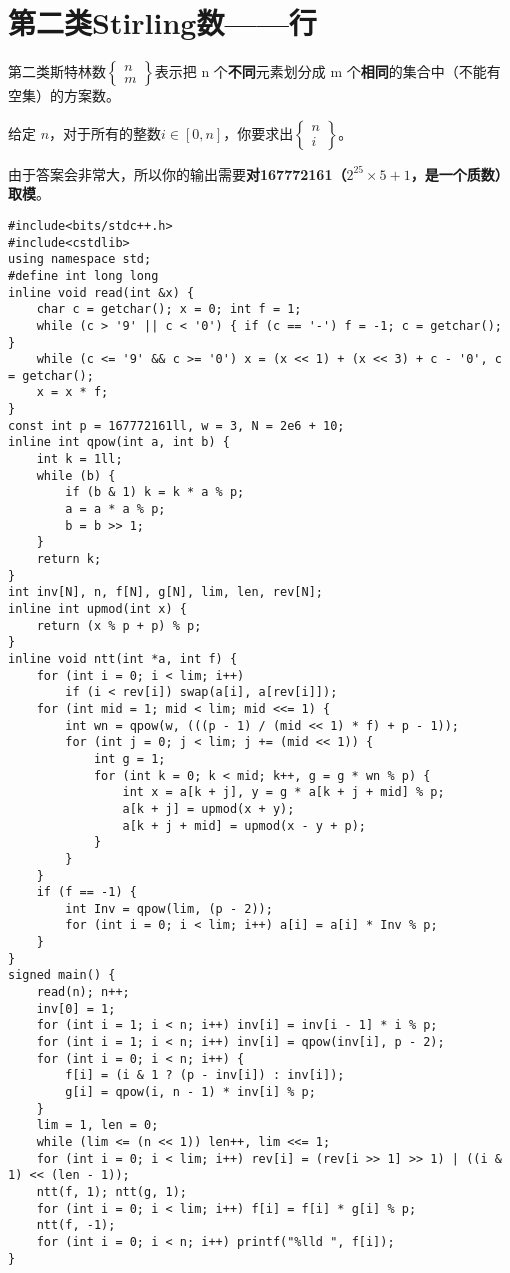 \section{第二类Stirling数——行}
\par \noindent 第二类斯特林数$\begin{Bmatrix} n \\m \end{Bmatrix}$表示把 n 个\textbf{不同}元素划分成 m 个\textbf{相同}的集合中（不能有空集）的方案数。
~\\
\par \noindent 给定 $n$，对于所有的整数$i\in[0,n]$，你要求出$\begin{Bmatrix} n \\i \end{Bmatrix}$。
~\\
\par \noindent 由于答案会非常大，所以你的输出需要\textbf{对167772161（$2^{25}\times 5+1$，是一个质数）取模}。
\begin{verbatim}
#include<bits/stdc++.h>
#include<cstdlib>
using namespace std;
#define int long long
inline void read(int &x) {
    char c = getchar(); x = 0; int f = 1;
    while (c > '9' || c < '0') { if (c == '-') f = -1; c = getchar(); }
    while (c <= '9' && c >= '0') x = (x << 1) + (x << 3) + c - '0', c = getchar();
    x = x * f;
}
const int p = 167772161ll, w = 3, N = 2e6 + 10;
inline int qpow(int a, int b) {
    int k = 1ll;
    while (b) {
        if (b & 1) k = k * a % p;
        a = a * a % p;
        b = b >> 1;
    }
    return k;
}
int inv[N], n, f[N], g[N], lim, len, rev[N];
inline int upmod(int x) {
    return (x % p + p) % p;
}
inline void ntt(int *a, int f) {
    for (int i = 0; i < lim; i++)
        if (i < rev[i]) swap(a[i], a[rev[i]]);
    for (int mid = 1; mid < lim; mid <<= 1) {
        int wn = qpow(w, (((p - 1) / (mid << 1) * f) + p - 1));
        for (int j = 0; j < lim; j += (mid << 1)) {
            int g = 1;
            for (int k = 0; k < mid; k++, g = g * wn % p) {
                int x = a[k + j], y = g * a[k + j + mid] % p;
                a[k + j] = upmod(x + y);
                a[k + j + mid] = upmod(x - y + p);
            }
        }
    }
    if (f == -1) {
        int Inv = qpow(lim, (p - 2));
        for (int i = 0; i < lim; i++) a[i] = a[i] * Inv % p;
    }
}
signed main() {
    read(n); n++;
    inv[0] = 1;
    for (int i = 1; i < n; i++) inv[i] = inv[i - 1] * i % p;
    for (int i = 1; i < n; i++) inv[i] = qpow(inv[i], p - 2);
    for (int i = 0; i < n; i++) {
        f[i] = (i & 1 ? (p - inv[i]) : inv[i]);
        g[i] = qpow(i, n - 1) * inv[i] % p;
    }
    lim = 1, len = 0;
    while (lim <= (n << 1)) len++, lim <<= 1;
    for (int i = 0; i < lim; i++) rev[i] = (rev[i >> 1] >> 1) | ((i & 1) << (len - 1));
    ntt(f, 1); ntt(g, 1);
    for (int i = 0; i < lim; i++) f[i] = f[i] * g[i] % p;
    ntt(f, -1);
    for (int i = 0; i < n; i++) printf("%lld ", f[i]);
}
\end{verbatim}
